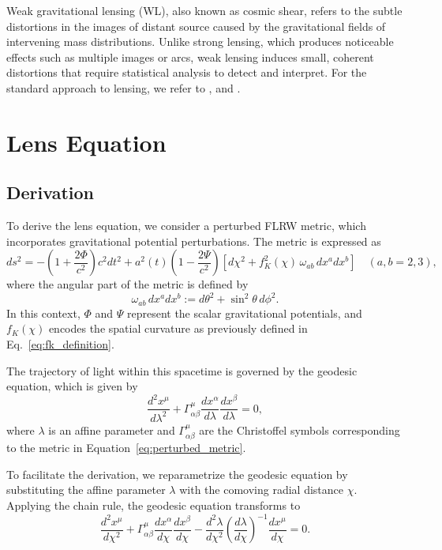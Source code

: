 Weak gravitational lensing (WL), also known as cosmic shear, refers to the subtle distortions in the images of distant source caused by the gravitational fields of intervening mass distributions. Unlike strong lensing, which produces noticeable effects such as multiple images or arcs, weak lensing induces small, coherent distortions that require statistical analysis to detect and interpret. For the standard approach to lensing, we refer to \citet{1992grle.book.....S}, \citet{2001PhR...340..291B} and \citet{2010CQGra..27w3001B}.

\section{Lens Equation}
\subsection{Derivation}
To derive the lens equation, we consider a perturbed FLRW metric, which incorporates gravitational potential perturbations. The metric is expressed as
\begin{equation}
    ds^2 = -\left(1 + \frac{2\Phi}{c^2}\right)c^2 dt^2 + a^2(t) \left(1 - \frac{2\Psi}{c^2}\right) \left[ d\chi^2 + f_K^2(\chi) \, \omega_{ab} \, dx^a dx^b \right] \quad (a, b = 2, 3),
    \label{eq:perturbed_metric}
\end{equation}
where the angular part of the metric is defined by
\begin{equation}
    \omega_{ab} \, dx^a dx^b := d\theta^2 + \sin^2 \theta \, d\phi^2.
    \label{eq:angular_metric}
\end{equation}
In this context, \( \Phi \) and \( \Psi \) represent the scalar gravitational potentials, and \( f_K(\chi) \) encodes the spatial curvature as previously defined in Eq.~\eqref{eq:fk_definition}.

The trajectory of light within this spacetime is governed by the geodesic equation, which is given by
\begin{equation}
    \frac{d^2 x^\mu}{d\lambda^2} + \Gamma^\mu_{\alpha \beta} \frac{dx^\alpha}{d\lambda} \frac{dx^\beta}{d\lambda} = 0,
    \label{eq:geodesic_equation}
\end{equation}
where \( \lambda \) is an affine parameter and \( \Gamma^\mu_{\alpha \beta} \) are the Christoffel symbols corresponding to the metric in Equation~\eqref{eq:perturbed_metric}.

To facilitate the derivation, we reparametrize the geodesic equation by substituting the affine parameter \( \lambda \) with the comoving radial distance \( \chi \). Applying the chain rule, the geodesic equation transforms to
\begin{equation}
    \frac{d^2 x^\mu}{d\chi^2} + \Gamma^\mu_{\alpha \beta} \frac{dx^\alpha}{d\chi} \frac{dx^\beta}{d\chi} - \frac{d^2 \lambda}{d\chi^2} \left( \frac{d\lambda}{d\chi} \right)^{-1} \frac{dx^\mu}{d\chi} = 0.
    \label{eq:geodesic_reparametrized}
\end{equation}

